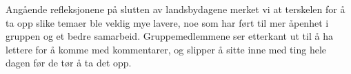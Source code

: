 Angående refleksjonene på slutten av landsbydagene merket vi at terskelen for å ta opp slike temaer ble veldig mye lavere, noe som har ført til mer åpenhet i gruppen og et bedre samarbeid. Gruppemedlemmene ser etterkant ut til å ha lettere for å komme med kommentarer, og slipper å sitte inne med ting hele dagen før de tør å ta det opp.


